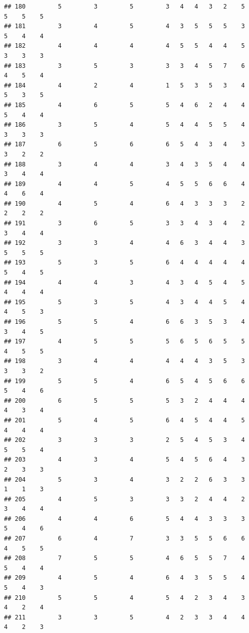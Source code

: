 \documentclass[
]{article}
\begin{document}
\begin{verbatim}
## 180         5         3         5         3   4   4   3   2    5    5    5    5
## 181         3         4         5         4   3   5   5   5    3    5    4    4
## 182         4         4         4         4   5   5   4   4    5    3    3    3
## 183         3         5         3         3   3   4   5   7    6    4    5    4
## 184         4         2         4         1   5   3   5   3    4    5    3    5
## 185         4         6         5         5   4   6   2   4    4    5    4    4
## 186         3         5         4         5   4   4   5   5    4    3    3    3
## 187         6         5         6         6   5   4   3   4    3    3    2    2
## 188         3         4         4         3   4   3   5   4    4    3    4    4
## 189         4         4         5         4   5   5   6   6    4    4    6    4
## 190         4         5         4         6   4   3   3   3    2    2    2    2
## 191         3         6         5         3   3   4   3   4    2    3    4    4
## 192         3         3         4         4   6   3   4   4    3    5    5    5
## 193         5         3         5         6   4   4   4   4    4    5    4    5
## 194         4         4         3         4   3   4   5   4    5    4    4    4
## 195         5         3         5         4   3   4   4   5    4    4    5    3
## 196         5         5         4         6   6   3   5   3    4    3    4    5
## 197         4         5         5         5   6   5   6   5    5    4    5    5
## 198         3         4         4         4   4   4   3   5    3    3    3    2
## 199         5         5         4         6   5   4   5   6    6    5    4    6
## 200         6         5         5         5   3   2   4   4    4    4    3    4
## 201         5         4         5         6   4   5   4   4    5    4    4    4
## 202         3         3         3         2   5   4   5   3    4    5    5    4
## 203         4         3         4         5   4   5   6   4    3    2    3    3
## 204         5         3         4         3   2   2   6   3    3    1    1    3
## 205         4         5         3         3   3   2   4   4    2    3    4    4
## 206         4         4         6         5   4   4   3   3    3    5    4    6
## 207         6         4         7         3   3   5   5   6    6    4    5    5
## 208         7         5         5         4   6   5   5   7    4    5    4    4
## 209         4         5         4         6   4   3   5   5    4    5    4    3
## 210         5         5         4         5   4   2   3   4    3    4    2    4
## 211         3         3         5         4   2   3   3   4    4    4    2    3

\end{verbatim}
\end{document}
